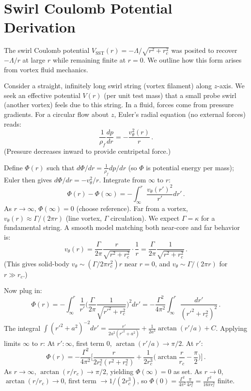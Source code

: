 \documentclass[10pt,reprint,aps,onecolumn,nofootinbib]{revtex4-2}
\begin{document}
	\section{Swirl Coulomb Potential Derivation}
	The swirl Coulomb potential $V_{\text{SST}}(r) = -\Lambda/\sqrt{r^2+r_c^2}$ was posited to recover $- \Lambda/r$ at large $r$ while remaining finite at $r=0$. We outline how this form arises from vortex fluid mechanics.

	Consider a straight, infinitely long swirl string (vortex filament) along $z$-axis. We seek an effective potential $V(r)$ (per unit test mass) that a small probe swirl (another vortex) feels due to this string. In a fluid, forces come from pressure gradients. For a circular flow about $z$, Euler’s radial equation (no external forces) reads:
	\[
		\frac{1}{\rho_f}\frac{dp}{dr} = -\frac{v_{\theta}^2(r)}{r}\,.
	\]
	(Pressure decreases inward to provide centripetal force.)

	Define $\Phi(r)$ such that $d\Phi/dr = \frac{1}{\rho_f}dp/dr$ (so $\Phi$ is potential energy per mass); Euler then gives $d\Phi/dr = -v_{\theta}^2/r$. Integrate from $\infty$ to $r$:
	\[
		\Phi(r) - \Phi(\infty) = -\int_{\infty}^{r} \frac{v_{\theta}(r')^2}{r'} dr'\,.
	\]
	As $r\to\infty$, $\Phi(\infty)=0$ (choose reference). Far from a vortex, $v_{\theta}(r) \approx \Gamma/(2\pi r)$ (line vortex, $\Gamma$ circulation). We expect $\Gamma = \kappa$ for a fundamental string. A smooth model matching both near-core and far behavior is:
	\[
		v_{\theta}(r) = \frac{\Gamma}{2\pi}\frac{r}{\sqrt{r^2+r_c^2}}\cdot\frac{1}{r} = \frac{\Gamma}{2\pi}\frac{1}{\sqrt{r^2+r_c^2}}\,.
	\]
	(This gives solid-body $v_{\theta}\sim (\Gamma/2\pi r_c^2)r$ near $r=0$, and $v_{\theta}\sim \Gamma/(2\pi r)$ for $r\gg r_c$.)

	Now plug in:
	\[
		\Phi(r) = -\int_{\infty}^{r} \frac{1}{r'}\Big(\frac{\Gamma}{2\pi}\frac{1}{\sqrt{r'^2+r_c^2}}\Big)^2 dr' = -\frac{\Gamma^2}{4\pi^2}\int_{\infty}^{r} \frac{dr'}{(r'^2+r_c^2)^2}\,.
	\]
	The integral $\int (r'^2+a^2)^{-2}dr' = \frac{r'}{2a^2(r'^2+a^2)} + \frac{1}{2a^3}\arctan(r'/a) + C$. Applying limits $\infty$ to $r$:
	At $r':\infty$, first term $0$, $\arctan(r'/a)\to\pi/2$. At $r'$:
	\[
		\Phi(r) = -\frac{\Gamma^2}{4\pi^2}\Big[\frac{r}{2r_c^2(r^2+r_c^2)} + \frac{1}{2r_c^3}\Big(\arctan\frac{r}{r_c} - \frac{\pi}{2}\Big)\Big]\,.
	\]
	As $r\to\infty$, $\arctan(r/r_c)\to\pi/2$, yielding $\Phi(\infty)=0$ as set. As $r\to0$, $\arctan(r/r_c)\to0$, first term $\to 1/(2r_c^3)$, so $\Phi(0) = \frac{\Gamma^2}{4\pi^2}\frac{\pi}{4r_c^3} = \frac{\Gamma^2}{16\pi r_c^3}$ finite.
\end{document}
